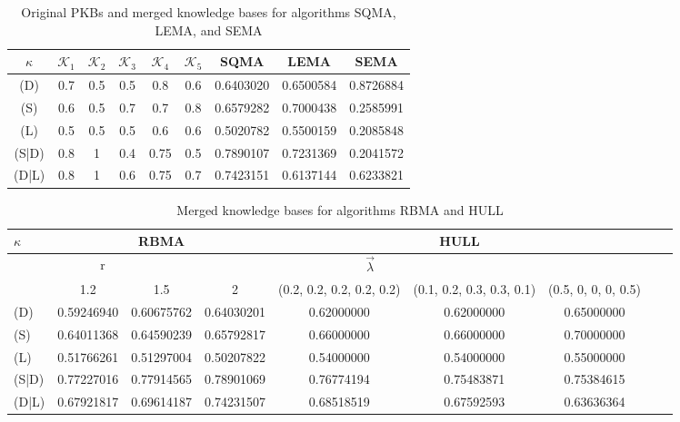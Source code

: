 \documentclass[]{iosart2c}
\begin{document}
\begin{table*}
\caption{Original PKBs and merged knowledge bases for algorithms SQMA, LEMA, and SEMA}
\begin{tabular}{|c|c|c|c|c|c|c|c|c|}
\hline
$\kappa$ & $\mathcal{K}_1$ & $\mathcal{K}_2$ & $\mathcal{K}_3$ & $\mathcal{K}_4$ & $\mathcal{K}_5$ & SQMA & LEMA & SEMA\\
\hline
(D)   &  0.7 &  0.5 &  0.5 &  0.8   &  0.6 &  0.6403020 &  0.6500584 &  0.8726884 \\
(S)   &  0.6 &  0.5 &  0.7 &  0.7   &  0.8 &  0.6579282 &  0.7000438 &  0.2585991 \\
(L)   &  0.5 &  0.5 &  0.5 &  0.6   &  0.6 &  0.5020782 &  0.5500159 &  0.2085848 \\
(S|D) &  0.8 &  1   &  0.4 &  0.75  &  0.5 &  0.7890107 &  0.7231369 &  0.2041572 \\
(D|L) &  0.8 &  1   &  0.6 &  0.75  &  0.7 &  0.7423151 &  0.6137144 &  0.6233821 \\
\hline
\end{tabular}
\end{table*}

\begin{table*}[htb]
\caption{Merged knowledge bases for algorithms RBMA and HULL}
\begin{tabular}{|l|c|c|c|c|c|c|c|c|}
\hline
{$\kappa$} & \multicolumn{3}{|c|}{RBMA} & \multicolumn{3}{|c|}{HULL}\\
\hline
\multicolumn{3}{|c|}{r} & \multicolumn{3}{|c|}{$\vec{\lambda}$}\\
\hline
      & 1.2        &   1.5       &   2  &  (0.2, 0.2, 0.2, 0.2, 0.2)& (0.1, 0.2, 0.3, 0.3, 0.1)&(0.5, 0, 0, 0, 0.5)\\
\hline
(D)   & 0.59246940 &  0.60675762 &  0.64030201 &  0.62000000        &       0.62000000         &      0.65000000\\
(S)   & 0.64011368 &  0.64590239 &  0.65792817 &  0.66000000        &       0.66000000         &      0.70000000\\
(L)   & 0.51766261 &  0.51297004 &  0.50207822 &  0.54000000        &       0.54000000         &      0.55000000\\
(S|D) & 0.77227016 &  0.77914565 &  0.78901069 &  0.76774194        &       0.75483871         &      0.75384615\\
(D|L) & 0.67921817 &  0.69614187 &  0.74231507 &  0.68518519        &       0.67592593         &      0.63636364\\
\end{tabular}
\end{table*}
\end{document}

